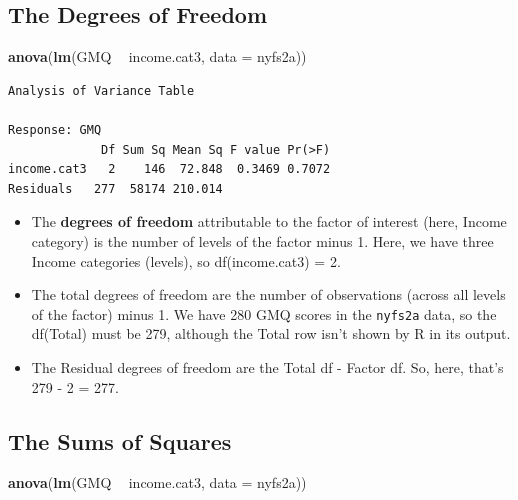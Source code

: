 \documentclass[
]{book}
\newenvironment{Shaded}{\begin{snugshade}}{\end{snugshade}}
\newcommand{\DataTypeTok}[1]{\textcolor[rgb]{0.13,0.29,0.53}{#1}}
\newcommand{\KeywordTok}[1]{\textcolor[rgb]{0.13,0.29,0.53}{\textbf{#1}}}
\newcommand{\NormalTok}[1]{#1}
\newcommand{\OperatorTok}[1]{\textcolor[rgb]{0.81,0.36,0.00}{\textbf{#1}}}
\newcommand{\StringTok}[1]{\textcolor[rgb]{0.31,0.60,0.02}{#1}}
\providecommand{\tightlist}{%
  \setlength{\itemsep}{0pt}\setlength{\parskip}{0pt}}
\begin{document}
\hypertarget{the-degrees-of-freedom}{%
\subsection{The Degrees of Freedom}\label{the-degrees-of-freedom}}

\begin{Shaded}
\begin{Highlighting}[]
\KeywordTok{anova}\NormalTok{(}\KeywordTok{lm}\NormalTok{(GMQ }\OperatorTok{~}\StringTok{ }\NormalTok{income.cat3, }\DataTypeTok{data =}\NormalTok{ nyfs2a))}
\end{Highlighting}
\end{Shaded}

\begin{verbatim}
Analysis of Variance Table

Response: GMQ
             Df Sum Sq Mean Sq F value Pr(>F)
income.cat3   2    146  72.848  0.3469 0.7072
Residuals   277  58174 210.014               
\end{verbatim}

\begin{itemize}
\tightlist
\item
  The \textbf{degrees of freedom} attributable to the factor of interest (here, Income category) is the number of levels of the factor minus 1. Here, we have three Income categories (levels), so df(income.cat3) = 2.
\item
  The total degrees of freedom are the number of observations (across all levels of the factor) minus 1. We have 280 GMQ scores in the \texttt{nyfs2a} data, so the df(Total) must be 279, although the Total row isn't shown by R in its output.
\item
  The Residual degrees of freedom are the Total df - Factor df. So, here, that's 279 - 2 = 277.
\end{itemize}

\hypertarget{the-sums-of-squares}{%
\subsection{The Sums of Squares}\label{the-sums-of-squares}}

\begin{Shaded}
\begin{Highlighting}[]
\KeywordTok{anova}\NormalTok{(}\KeywordTok{lm}\NormalTok{(GMQ }\OperatorTok{~}\StringTok{ }\NormalTok{income.cat3, }\DataTypeTok{data =}\NormalTok{ nyfs2a))}
\end{Highlighting}
\end{Shaded}
\end{document}
